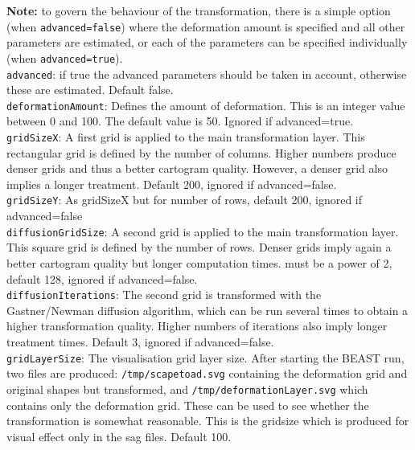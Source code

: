 \documentclass{article}
\begin{document}
{\bf Note:} to govern the behaviour of the transformation, there is a simple option (when {\tt advanced=false}) where the deformation amount is specified and all other parameters are estimated, or each of the parameters can be specified individually (when {\tt advanced=true}).\\

{\tt advanced}: if true the advanced parameters should be taken in account, otherwise these are estimated. Default false.\\

{\tt deformationAmount}: Defines the amount of deformation. This is an integer value between 0 and 100. The default value is 50. Ignored if advanced=true.\\

{\tt gridSizeX}: A first grid is applied to the main transformation layer. 
This rectangular grid is defined by the number of columns. 
Higher numbers produce denser grids and thus a better cartogram quality. 
However, a denser grid also implies a longer treatment. 
Default 200, ignored if advanced=false.\\

{\tt gridSizeY}: As gridSizeX but for number of rows, default 200, ignored if advanced=false\\

{\tt diffusionGridSize}: A second grid is applied to the main transformation layer. 
This square grid is defined by the number of rows. 
Denser grids imply again a better cartogram quality but longer computation times.
must be a power of 2, default 128, ignored if advanced=false.\\

{\tt diffusionIterations}: The second grid is transformed with the Gastner/Newman diffusion 
algorithm, which can be run several times to obtain a higher transformation quality. 
Higher numbers of iterations also imply longer treatment times.
Default 3, ignored if advanced=false.\\

{\tt gridLayerSize}: The visualisation grid layer size. After starting the BEAST run, two files are produced:
{\tt /tmp/scapetoad.svg} containing the deformation grid and original shapes but transformed, and 
{\tt /tmp/deformationLayer.svg} which contains only the deformation grid. These can be used to see whether the transformation is somewhat reasonable. This is the gridsize which is produced for visual effect only in the sag files. 
Default 100.
\end{document}
